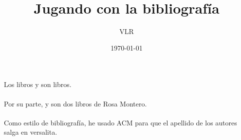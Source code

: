 \documentclass[12pt,a4paper]{article}
\begin{document}
	\title{Jugando con la bibliografía}
	\author{VLR}
	\date{\today}
	\maketitle
	

Los libros \cite{Cepeda2013} y \cite{Cisneros1984} son libros. \\ \\

Por su parte, \cite{Montero1988} y \cite{Montero2005} son dos libros de Rosa Montero. \\ \\

Como estilo de bibliografía, he usado ACM para que el apellido de los autores salga en versalita. 
	
	
\end{document}

